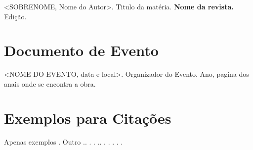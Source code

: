 <SOBRENOME, Nome do Autor>. Titulo da matéria. \textbf{Nome da
revista.} Edição.

\section{Documento de Evento}

<NOME DO EVENTO, data e local>. Organizador do Evento. Ano,
pagina dos anais onde se encontra a obra. 

\section{Exemplos para Citações}

Apenas exemplos \cite{7.1.3-1}. Outro \cite{NBR6023:2000}.\cite{NBR10520:1988}. \cite{7.3.2-2}. \cite{7.4.2.1-3}. \cite{7.4.2.1-2}.\cite{7.4.2.3-5}. \cite{7.4.2.1-4}. 
\cite{7.7.1.2-5}. \cite{7.7.1.2-2}. \cite{7.4.2.3-6}. \cite{8.1.1.5}.
